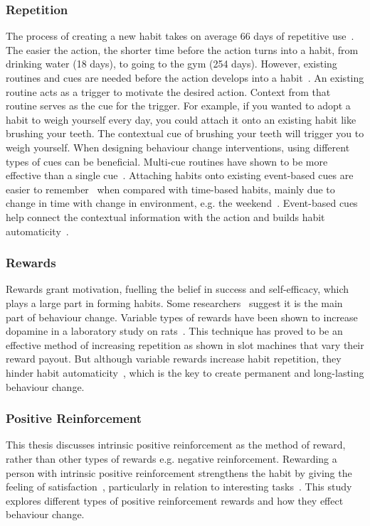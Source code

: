 \subsubsection*{Repetition}
The process of creating a new habit takes on average 66 days of repetitive use~\cite{article_how_habits_formed_modelling_habit_formation}. The easier the action, the shorter time before the action turns into a habit, from drinking water (18 days), to going to the gym (254 days). However, existing routines and cues are needed before the action develops into a habit~\cite{habits_event_cues_1, habits_event_cues_2}. An existing routine acts as a trigger to motivate the desired action. Context from that routine serves as the cue for the trigger. For example, if you wanted to adopt a habit to weigh yourself every day, you could attach it onto an existing habit like brushing your teeth. The contextual cue of brushing your teeth will trigger you to weigh yourself. When designing behaviour change interventions, using different types of cues can be beneficial. Multi-cue routines have shown to be more effective than a single cue~\cite{article_understanding_use_contextual_cues_design_impl}. Attaching habits onto existing event-based cues are easier to remember~\cite{article_implementation_intentions_multicue} when compared with time-based habits, mainly due to change in time with change in environment, e.g. the weekend~\cite{coaching_not_that_good}. Event-based cues help connect the contextual information with the action and builds habit automaticity~\cite{article_implementation_intentions}.

\subsubsection*{Rewards}
Rewards grant motivation, fuelling the belief in success and self-efficacy, which plays a large part in forming habits. Some researchers~\cite{article_a_self_efficacy} suggest it is the main part of behaviour change. Variable types of rewards have been shown to increase dopamine in a laboratory study on rats~\cite{variable_rewards_increases_dopamine}. This technique has proved to be an effective method of increasing repetition as shown in slot machines that vary their reward payout. But although variable rewards increase habit repetition, they hinder habit automaticity~\cite{variable_rewards_increases_dopamine}, which is the key to create permanent and long-lasting behaviour change.

\subsubsection*{Positive Reinforcement}
This thesis discusses intrinsic positive reinforcement as the method of reward, rather than other types of rewards e.g. negative reinforcement. Rewarding a person with intrinsic positive reinforcement strengthens the habit by giving the feeling of satisfaction~\cite{article_promoting_habit_formation}, particularly in relation to interesting tasks~\cite{article_meta_analytic_review_intrinsic_motivation}. This study explores different types of positive reinforcement rewards and how they effect behaviour change.


